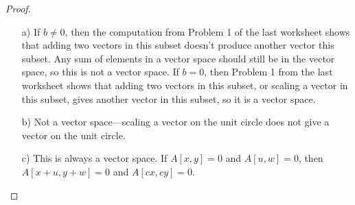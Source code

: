 \documentclass{article}
\theoremstyle{definition}
\begin{document}
\begin{proof}
	\begin{itemize}
		\item[a)] If $b \neq 0$, then the computation from Problem 1 of the last worksheet shows that adding two vectors in this subset doesn't produce another vector this subset. Any sum of elements in a vector space should still be in the vector space, so this is not a vector space. If $b=0$, then Problem 1 from the last worksheet shows that adding two vectors in this subset, or scaling a vector in this subset, gives another vector in this subset, so it is a vector space.
		\item[b)] Not a vector space---scaling a vector on the unit circle does not give a vector on the unit circle.
		\item[c)] This is always a vector space. If $A[x, y]=0$ and $A[u, w]=0$, then $A[x+u, y+w]=0$ and $A[cx, cy]=0$.
	\end{itemize}
\end{proof}
\end{document}
